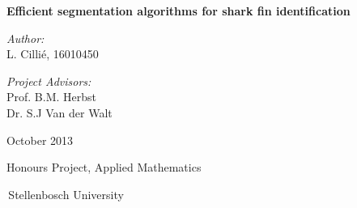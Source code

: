 \documentclass[a4paper,10pt]{article}
\newenvironment{changemargin}[2]{%
\begin{list}{}{%
\setlength{\topsep}{0pt}%
\setlength{\leftmargin}{#1}%
\setlength{\rightmargin}{#2}%
\setlength{\listparindent}{\parindent}%
\setlength{\itemindent}{\parindent}%
\setlength{\parsep}{\parskip}%
}%
\item[]}{\end{list}}
\begin{document}
\begin{titlepage}

\begin{changemargin}{-1cm}{-1cm}
\begin{center}

\begin{minipage}{1.2\textwidth}
\begin{center}
\vspace{2cm}
    {\Huge \bf Efficient segmentation algorithms for shark fin
identification }
\end{center}
\end{minipage}

\vspace{1.3cm}

\begin{minipage}{0.49\textwidth}
\begin{center} \LARGE
\emph{Author:}\\
L. Cilli\'{e}, 16010450
\end{center}
\end{minipage}
\begin{minipage}{0.49\textwidth}
\begin{center} \LARGE
\emph{Project Advisors:} \\
Prof. B.M. Herbst\\Dr. S.J Van der Walt

\end{center}
\end{minipage}

\vspace{1.3cm}
{\LARGE October 2013}

\end{center}

\vfill

\vspace{20mm}
\hfill{\LARGE Honours Project, Applied Mathematics}\hfill\,

\,\hfill{\LARGE Stellenbosch University}\hfill\,

\end{changemargin}

\end{titlepage}

\begin{abstract}
This research project focusses on the investigation of various segmentation algorithms for the identification of Great White sharks.
This is accomplished by analysing shark fin images using a computer.  The Growcut algorithm is used as the main form of segmentation.
A pipeline is developed containing various algorithms in aid of the identification process.  The pipeline can be used to compare new shark fin images with existing images in a database, establishing whether the shark is already on the database or not.  From this, a more accurate population estimate can be determined, thereby assisting in the conservation of Great White sharks.
\end{abstract}
\end{document}
